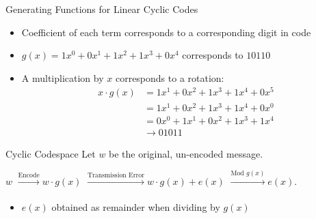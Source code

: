 \documentclass[aspectratio=169]{beamer}
\begin{document}
\begin{frame}{Generating Functions for Linear Cyclic Codes}
    \begin{itemize}
        \item Coefficient of each term corresponds to a corresponding digit in code
        \item $g(x) = 1x^0 + 0x^1 + 1x^2 + 1x^3 + 0x^4$ corresponds to $10110$ \pause
        \item A multiplication by $x$ corresponds to a rotation:
        \begin{align*}
            x \cdot g(x)
            & = 1x^1 + 0x^2 + 1x^3 + 1x^4 + 0x^5 \\
            & = 1x^1 + 0x^2 + 1x^3 + 1x^4 + 0x^0 \\
            & = 0x^0 + 1x^1 + 0x^2 + 1x^3 + 1x^4 \\
            & \to 01011
        \end{align*}
    \end{itemize}
\end{frame}

\begin{frame}{Cyclic Codespace}
    Let $w$ be the original, un-encoded message.

    \begin{center}
        $w$ 
        \pause
        $\xrightarrow[]{\text{Encode}} w\cdot g(x)$
        \pause
        $\xrightarrow[]{\text{Transmission Error}} w \cdot g(x) + e(x)$
        \pause
        $\xrightarrow[]{\text{Mod } g(x)} e(x)$.
    \end{center}
    \pause
    \begin{itemize}
        \item $e(x)$ obtained as remainder when dividing by $g(x)$
    \end{itemize}
\end{frame}
\end{document}
